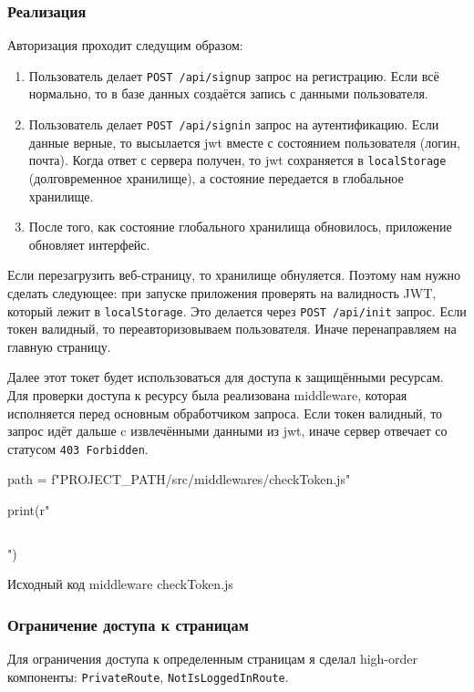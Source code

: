 \subsubsection{Реализация}
Авторизация проходит следущим образом:
\begin{enumerate}
    \item Пользователь делает \texttt{POST /api/signup} запрос на регистрацию. Если всё нормально, то в базе данных создаётся запись с данными пользователя.
    \item Пользователь делает \texttt{POST /api/signin} запрос на аутентификацию. Если данные верные, то высылается \acrshort{jwt} вместе с состоянием пользователя (логин, почта). Когда ответ с сервера получен, то \acrshort{jwt} сохраняется в \texttt{localStorage} (долговременное хранилище), а состояние передается в глобальное \textcite{redux} хранилище.
    \item После того, как состояние глобального хранилища обновилось, приложение обновляет интерфейс.
\end{enumerate}

Если перезагрузить веб-страницу, то \textcite{redux} хранилище обнуляется. Поэтому нам нужно сделать следующее: при запуске приложения проверять на валидность JWT, который лежит в \texttt{localStorage}. Это делается через \texttt{POST /api/init} запрос. Если токен валидный, то переавторизовываем пользователя. Иначе перенаправляем на главную страницу.

Далее этот токет будет использоваться для доступа к защищёнными ресурсам. Для проверки доступа к ресурсу была реализована middleware, которая исполняется перед основным обработчиком запроса. Если токен валидный, то запрос идёт дальше c извлечёнными данными из \acrshort{jwt}, иначе сервер отвечает со статусом \texttt{403 Forbidden}.

\begin{listing}[H]
\begin{pycode}
path = f"{PROJECT_PATH}/src/middlewares/checkToken.js"

print(r"\inputminted{js}{" + path + r"}")
\end{pycode}
\caption{Исходный код middleware checkToken.js}
\end{listing}

\subsubsection{Ограничение доступа к страницам}
Для ограничения доступа к определенным страницам я сделал high-order компоненты: \texttt{PrivateRoute}, \texttt{NotIsLoggedInRoute}.

